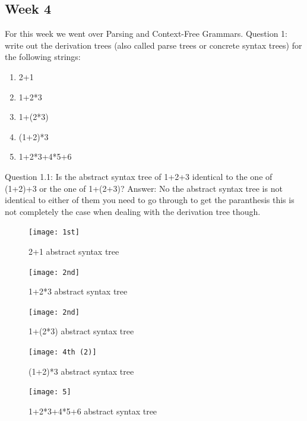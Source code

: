 \documentclass{article}
\theoremstyle{theorem}
\theoremstyle{definition}
\theoremstyle{remark}
\begin{document}
\subsection{Week 4}
For this week we went over Parsing and Context-Free Grammars.
Question 1:
write out the derivation trees (also called parse trees or concrete syntax trees) for the following strings:
\begin{enumerate}

\item 2+1
\item 1+2*3
\item 1+(2*3)
\item (1+2)*3
\item 1+2*3+4*5+6

    \end{enumerate}
    Question 1.1:
    Is the abstract syntax tree of 1+2+3 identical to the one of (1+2)+3 or the one of 1+(2+3)?
    Answer: No the abstract syntax tree is not identical to either of them you need to go through to get the paranthesis this is not completely the case when dealing with the derivation tree though.
 \begin{figure}[htp]
    \centering
    \texttt{[image: 1st]}
    \caption{ 2+1  abstract syntax tree }
    \label{fig: 2+1}
\end{figure}
 \begin{figure}[htp]
    \centering
    \texttt{[image: 2nd]}
    \caption{1+2*3 abstract syntax tree}
    \label{fig:1+2*3}
\end{figure}
 \begin{figure}[htp]
    \centering
    \texttt{[image: 2nd]}
    \caption{1+(2*3)  abstract syntax tree}
    \label{fig:1+(2*3)}
\end{figure}
 \begin{figure}[htp]
    \centering
    \texttt{[image: 4th (2)]}
    \caption{(1+2)*3  abstract syntax tree}
    \label{fig:(1+2)*3}
\end{figure}
 \begin{figure}[htp]
    \centering
    \texttt{[image: 5]}
    \caption{1+2*3+4*5+6  abstract syntax tree}
    \label{fig:1+2*3+4*5+6}
\end{figure}
\end{document}
